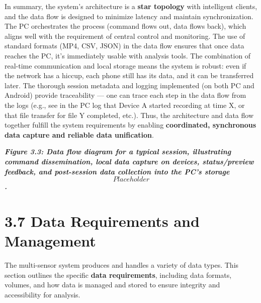 In summary, the system's architecture is a \textbf{star topology} with
intelligent clients, and the data flow is designed to minimize latency
and maintain synchronization. The PC orchestrates the process (command
flows out, data flows back), which aligns well with the requirement of
central control and monitoring. The use of standard formats (MP4, CSV,
JSON) in the data flow ensures that once data reaches the PC, it's
immediately usable with analysis tools. The combination of real-time
communication and local storage means the system is robust: even if the
network has a hiccup, each phone still has its data, and it can be
transferred later. The thorough session metadata and logging implemented
(on both PC and Android) provide traceability --- one can trace each step
in the data flow from the logs (e.g., see in the PC log that Device A
started recording at time X, or that file transfer for file Y completed,
etc.). Thus, the architecture and data flow together fulfill the system
requirements by enabling \textbf{coordinated, synchronous data capture and
reliable data unification}.

\textit{\textbf{Figure 3.3: Data flow diagram for a typical session, illustrating
command dissemination, local data capture on devices, status/preview
feedback, and post-session data collection into the PC's storage
\[Placeholder\].}}

\section{3.7 Data Requirements and Management}

The multi-sensor system produces and handles a variety of data types.
This section outlines the specific \textbf{data requirements}, including data
formats, volumes, and how data is managed and stored to ensure integrity
and accessibility for analysis.


